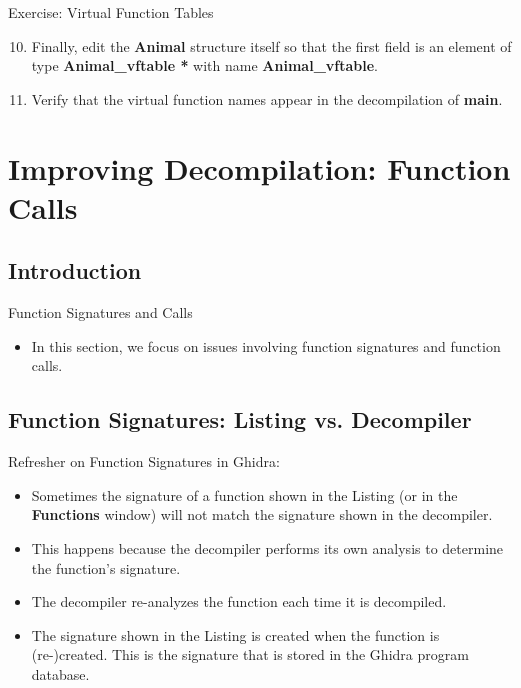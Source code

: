 \documentclass{beamer}
\begin{document}
\begin{frame}
\begin{block}{Exercise: Virtual Function Tables}
\begin{enumerate}
\setcounter{enumi}{9}
\item Finally, edit the \textbf{Animal} structure itself so that the first field is an element of type \textbf{Animal\_vftable *} with name \textbf{Animal\_vftable}.
\item Verify that the virtual function names appear in the decompilation of \textbf{main}.
\end{enumerate}
\end{block}
\end{frame}

\section{Improving Decompilation: Function Calls}

\subsection{Introduction}
\begin{frame}
\begin{block}{Function Signatures and Calls}
\begin{itemize}
\item In this section, we focus on issues involving function signatures and function calls.
\end{itemize}
\end{block}
\end{frame}

\subsection{Function Signatures: Listing vs. Decompiler}
\begin{frame}
\begin{block}{Refresher on Function Signatures in Ghidra:}
\begin{itemize}
\item Sometimes the signature of a function shown in the Listing (or in the \textbf{Functions} window) will not match the signature shown in the decompiler.
\item This happens because the decompiler performs its own analysis to determine the function's signature.
\item The decompiler re-analyzes the function each time it is decompiled.  
\item The signature shown in the Listing is created when the function is (re-)created.  This is the signature that is stored in the Ghidra program database.
\end{itemize}
\end{block}
\end{frame}
\end{document}
